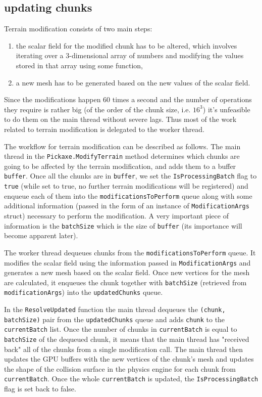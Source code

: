 \subsection{updating chunks}
Terrain modification consists of two main steps:
\begin{enumerate}
    \item the scalar field for the modified chunk has to be altered, which involves iterating over a 3-dimensional array of numbers and modifying the values stored in that array using some function,
    \item a new mesh has to be generated based on the new values of the scalar field.
\end{enumerate}
Since the modifications happen 60 times a second and the number of operations they require is rather big (of the order of the chunk size, i.e. $16^3$) it's unfeasible to do them on the main thread without severe lags.
Thus most of the work related to terrain modification is delegated to the worker thread.

The workflow for terrain modification can be described as follows.
The main thread in the \texttt{Pickaxe.ModifyTerrain} method determines which chunks are going to be affected by the terrain modification, and adds them to a buffer \texttt{buffer}.
Once all the chunks are in \texttt{buffer}, we set the \texttt{IsProcessingBatch} flag to \texttt{true} (while set to true, no further terrain modifications will be registered) and enqueue each of them into the \texttt{modificationsToPerform} queue along with some additional information (passed in the form of an instance of \texttt{ModificationArgs} struct) necessary to perform the modification.
A very important piece of information is the \texttt{batchSize} which is the size of \texttt{buffer} (its importance will become apparent later).

The worker thread dequeues chunks from the \texttt{modificationsToPerform} queue.
It modifies the scalar field using the information passed in \texttt{ModificationArgs} and generates a new mesh based on the scalar field.
Once new vertices for the mesh are calculated, it enqueues the chunk together with \texttt{batchSize} (retrieved from \texttt{modificationArgs}) into the \texttt{updatedChunks} queue.

In the \texttt{ResolveUpdated} function the main thread dequeues the \texttt{(chunk, batchSize)} pair from the \texttt{updatedChunks} queue and adds \texttt{chunk} to the \texttt{currentBatch} list.
Once the number of chunks in \texttt{currentBatch} is equal to \texttt{batchSize} of the dequeued chunk, it means that the main thread has "received back" all of the chunks from a single modification call.
The main thread then updates the GPU buffers with the new vertices of the chunk's mesh and updates the shape of the collision surface in the physics engine for each chunk from \texttt{currentBatch}.
Once the whole \texttt{currentBatch} is updated, the \texttt{IsProcessingBatch} flag is set back to false.

